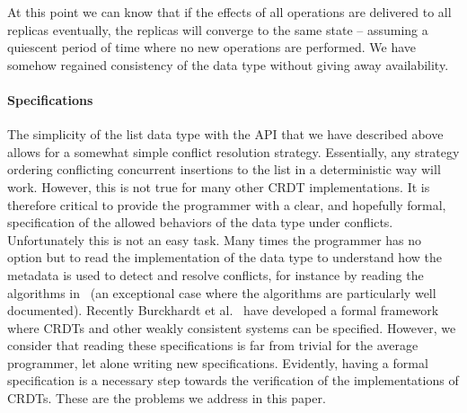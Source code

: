 At this point we can know that if the effects of all operations are
delivered to all replicas eventually, the replicas will converge to
the same state -- assuming a quiescent period of time where no new
operations are performed.
%
We have somehow regained consistency of the data type without
giving away availability.

\paragraph{Specifications}
The simplicity of the list data type with the API that we have
described above allows for a somewhat simple conflict resolution
strategy.
%
Essentially, any strategy ordering conflicting concurrent insertions
to the list in a deterministic way will work.
%
However, this is not true for many other CRDT implementations.
%
It is therefore critical to provide the programmer with a clear, and
hopefully formal, specification of the allowed behaviors of the data
type under conflicts.
%
Unfortunately this is not an easy task.
%
Many times the programmer has no option but to read the implementation
of the data type to understand how the metadata is used to detect and
resolve conflicts, for instance by reading the algorithms
in~\cite{ShapiroPBZ11} (an exceptional case where the algorithms are
particularly well documented).
%
Recently Burckhardt et al.~\cite{BurckhardtGYZ14, Burckhardt14} have
developed a formal framework where CRDTs and other weakly
consistent systems can be specified.
%
However, we consider that reading these specifications is far from
trivial for the average programmer, let alone writing new
specifications.
%
Evidently, having a formal specification is a necessary step towards
the verification of the implementations of CRDTs.
%
These are the problems we address in this paper.


